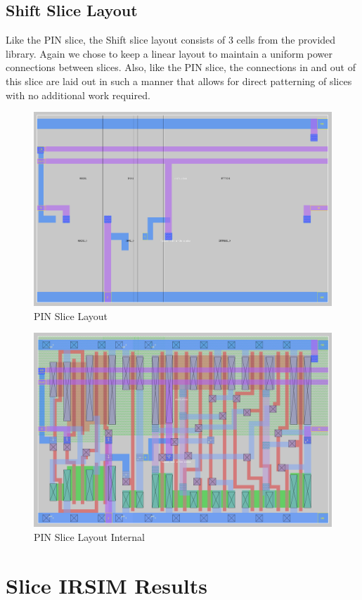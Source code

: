     \subsection{Shift Slice Layout}
        Like the PIN slice, the Shift slice layout consists of 3 cells from the provided library.
        Again we chose to keep a linear layout to maintain a uniform power connections between slices.
        Also, like the PIN slice, the connections in and out of this slice are laid out in such a manner
        that allows for direct patterning of slices with no additional work required.
        \begin{figure}[H]
            \centering
            \includegraphics[width=0.75\linewidth]{../../magic/images/shift_slice.png}
            \caption{PIN Slice Layout}
        \end{figure}
        \begin{figure}[H]
            \centering
            \includegraphics[width=0.75\linewidth]{../../magic/images/shift_slice_internal.png}
            \caption{PIN Slice Layout Internal}
        \end{figure}

\newpage
\section{Slice IRSIM Results}

